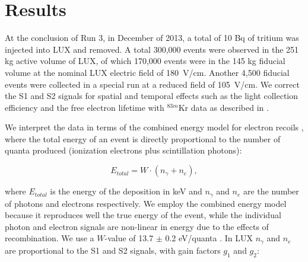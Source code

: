 \section{Results}

At the conclusion of Run 3, in December of 2013, a total of 10 Bq of tritium was injected into LUX and removed. A total 300,000 events were observed in the 251 kg active volume of LUX, of which 170,000 events were in the 145 kg fiducial volume at the nominal LUX electric field of 180~V/cm. Another 4,500 fiducial events were collected in a special run at a reduced field of 105~V/cm. We correct the S1 and S2 signals for spatial and temporal effects such as the light collection efficiency and the free electron lifetime with $ ^{83m}$Kr data as described in \cite{lux-reanalysis}. 



We interpret the data in terms of the combined energy model for electron recoils \cite{Platzman}, where the total energy of an event is directly proportional to the number of quanta produced (ionization electrons plus scintillation photons):

\begin{equation}
E_{total} = W \cdot (n_{\gamma} + n_e ),
\label{platzman_eq}
\end{equation}

\noindent
where $E_{total}$ is the energy of the deposition in keV and  $n_\gamma$ and $n_e$ are the number of photons and electrons respectively. We employ the combined energy model because it reproduces well the true energy of the event, while the individual photon and electron signals are non-linear in energy due to the effects of recombination. We use a $W$-value of 13.7 $\pm$ 0.2 eV/quanta \cite{Dahl_Thesis}. In LUX $n_{\gamma}$ and $n_e$ are proportional to the S1 and S2 signals, with gain factors $g_1$ and $g_2$: 

